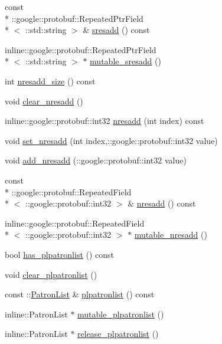\begin{DoxyCompactItemize}
\item 
const \\*
\-::google\-::protobuf\-::\-Repeated\-Ptr\-Field\\*
$<$ \-::std\-::string $>$ \& \hyperlink{classResponse_a5c4c7fa2b6353c11d17a2fecdacce775}{sresadd} () const 
\item 
inline\-::google\-::protobuf\-::\-Repeated\-Ptr\-Field\\*
$<$ \-::std\-::string $>$ $\ast$ \hyperlink{classResponse_a5171a5b3dc4e19165aa183881c7aaa7c}{mutable\-\_\-sresadd} ()
\item 
int \hyperlink{classResponse_aeaaaba68df603c4e059a1fde8135822d}{nresadd\-\_\-size} () const 
\item 
void \hyperlink{classResponse_ab6841e4cd78d2d5098cf4e9eb171e341}{clear\-\_\-nresadd} ()
\item 
inline\-::google\-::protobuf\-::int32 \hyperlink{classResponse_ab73a9866c9c69953793ee6a09105a5b5}{nresadd} (int index) const 
\item 
void \hyperlink{classResponse_a97a4e842fbe8876e55a1365120ecc2a7}{set\-\_\-nresadd} (int index,\-::google\-::protobuf\-::int32 value)
\item 
void \hyperlink{classResponse_a21790b9d55caa6c4bd488af3aa679751}{add\-\_\-nresadd} (\-::google\-::protobuf\-::int32 value)
\item 
const \\*
\-::google\-::protobuf\-::\-Repeated\-Field\\*
$<$ \-::google\-::protobuf\-::int32 $>$ \& \hyperlink{classResponse_ad25482f002cf981d1b161eab2c8eaed4}{nresadd} () const 
\item 
inline\-::google\-::protobuf\-::\-Repeated\-Field\\*
$<$ \-::google\-::protobuf\-::int32 $>$ $\ast$ \hyperlink{classResponse_ac9a4f12cdd0fac7c5fb7eaa5232833f1}{mutable\-\_\-nresadd} ()
\item 
bool \hyperlink{classResponse_a25fc8f152bf1d48afd91229aa408a47a}{has\-\_\-plpatronlist} () const 
\item 
void \hyperlink{classResponse_a5f7ebbfc7a918e205fac7f619dba7a8c}{clear\-\_\-plpatronlist} ()
\item 
const \-::\hyperlink{classPatronList}{Patron\-List} \& \hyperlink{classResponse_a87d6a0656c068dfd302816a8ff84eb08}{plpatronlist} () const 
\item 
inline\-::\-Patron\-List $\ast$ \hyperlink{classResponse_a5070d4d2f591122b36d6c2e83a790ebb}{mutable\-\_\-plpatronlist} ()
\item 
inline\-::\-Patron\-List $\ast$ \hyperlink{classResponse_a0c2b8114138c6ed8b46b19bb3e76d35d}{release\-\_\-plpatronlist} ()
\end{DoxyCompactItemize}
